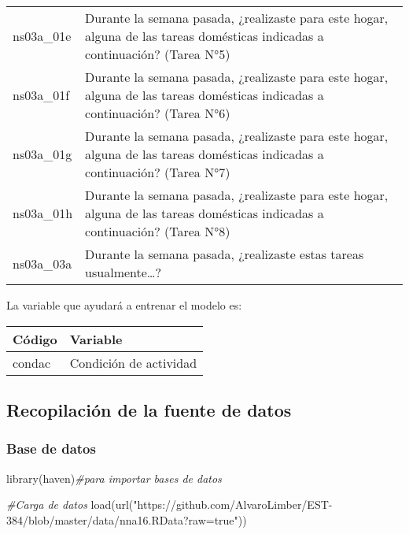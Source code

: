 \documentclass[
]{article}
\newenvironment{Shaded}{\begin{snugshade}}{\end{snugshade}}
\newcommand{\CommentTok}[1]{\textcolor[rgb]{0.56,0.35,0.01}{\textit{#1}}}
\newcommand{\FunctionTok}[1]{\textcolor[rgb]{0.00,0.00,0.00}{#1}}
\newcommand{\NormalTok}[1]{#1}
\newcommand{\StringTok}[1]{\textcolor[rgb]{0.31,0.60,0.02}{#1}}
\begin{document}
\begin{longtable}[]{@{}
  >{\raggedright\arraybackslash}p{}
  >{\raggedright\arraybackslash}p{}@{}}
ns03a\_01e & Durante la semana pasada, ¿realizaste para este hogar,
alguna de las tareas domésticas indicadas a continuación? (Tarea N°5) \\
ns03a\_01f & Durante la semana pasada, ¿realizaste para este hogar,
alguna de las tareas domésticas indicadas a continuación? (Tarea N°6) \\
ns03a\_01g & Durante la semana pasada, ¿realizaste para este hogar,
alguna de las tareas domésticas indicadas a continuación? (Tarea N°7) \\
ns03a\_01h & Durante la semana pasada, ¿realizaste para este hogar,
alguna de las tareas domésticas indicadas a continuación? (Tarea N°8) \\
ns03a\_03a & Durante la semana pasada, ¿realizaste estas tareas
usualmente\ldots? \\
\bottomrule()
\end{longtable}

La variable que ayudará a entrenar el modelo es:

\begin{longtable}[]{@{}ll@{}}
\toprule()
Código & Variable \\
\midrule()
\endhead
condac & Condición de actividad \\
\bottomrule()
\end{longtable}

\hypertarget{recopilaciuxf3n-de-la-fuente-de-datos}{%
\subsection{Recopilación de la fuente de
datos}\label{recopilaciuxf3n-de-la-fuente-de-datos}}

\hypertarget{base-de-datos}{%
\subsubsection{Base de datos}\label{base-de-datos}}

\begin{Shaded}
\begin{Highlighting}[]
\FunctionTok{library}\NormalTok{(haven)}\CommentTok{\#para importar bases de datos}

\CommentTok{\#Carga de datos}
\FunctionTok{load}\NormalTok{(}\FunctionTok{url}\NormalTok{(}\StringTok{"https://github.com/AlvaroLimber/EST{-}384/blob/master/data/nna16.RData?raw=true"}\NormalTok{))}
\end{Highlighting}
\end{Shaded}
\end{document}
